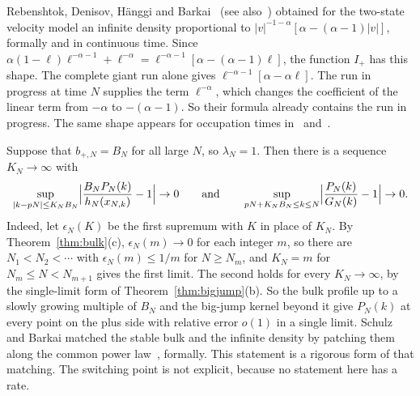Rebenshtok, Denisov, H\"anggi and Barkai~\cite[Eqs.~(8) and~(10)]{rdhb2014} (see
also~\cite[Eqs.~(38) and~(52)]{rdhb2014b}) obtained for the two-state velocity model
an infinite density proportional to $|v|^{-1-\alpha}[\alpha-(\alpha-1)|v|]$, formally
and in continuous time. Since
$\alpha(1-\ell)\ell^{-\alpha-1}+\ell^{-\alpha}=\ell^{-\alpha-1}[\alpha-(\alpha-1)\ell]$,
the function $I_\plus$ has this shape. The complete giant run alone gives
$\ell^{-\alpha-1}[\alpha-\alpha\ell]$. The run in progress at time $N$ supplies the term
$\ell^{-\alpha}$, which changes the coefficient of the linear term from $-\alpha$ to
$-(\alpha-1)$. So their formula already contains the run in progress. The same
shape appears for occupation times in~\cite[Eq.~(25)]{sb2015}
and~\cite[Eq.~(83)]{wsdb2018}.

Suppose that $b_{\plus,N}=B_N$ for all large $N$, so $\lambda_N=1$. Then there is a
sequence $K_N\to\infty$ with
\[
 \sup_{|k-pN|\le K_NB_N}\Bigl|\frac{B_NP_N(k)}{h_N(x_{N,k})}-1\Bigr|\to0
 \qquad\text{and}\qquad
 \sup_{pN+K_NB_N\le k\le N}\Bigl|\frac{P_N(k)}{G_N(k)}-1\Bigr|\to0 .
\]
Indeed, let $\epsilon_N(K)$ be the first supremum with $K$ in place of $K_N$. By
Theorem~\ref{thm:bulk}(c), $\epsilon_N(m)\to0$ for each integer $m$, so there are
$N_1<N_2<\cdots$ with $\epsilon_N(m)\le1/m$ for $N\ge N_m$, and $K_N=m$ for
$N_m\le N<N_{m+1}$ gives the first limit. The second holds for every $K_N\to\infty$,
by the single-limit form of Theorem~\ref{thm:bigjump}(b). So the bulk profile up
to a slowly growing multiple of $B_N$ and the big-jump kernel beyond it give
$P_N(k)$ at every point on the plus side with relative error $o(1)$ in a single
limit. Schulz and Barkai matched the stable bulk and the infinite density by
patching them along the common power law~\cite[Eq.~(26)]{sb2015}, formally. This
statement is a rigorous form of that matching. The switching point is not
explicit, because no statement here has a rate.

